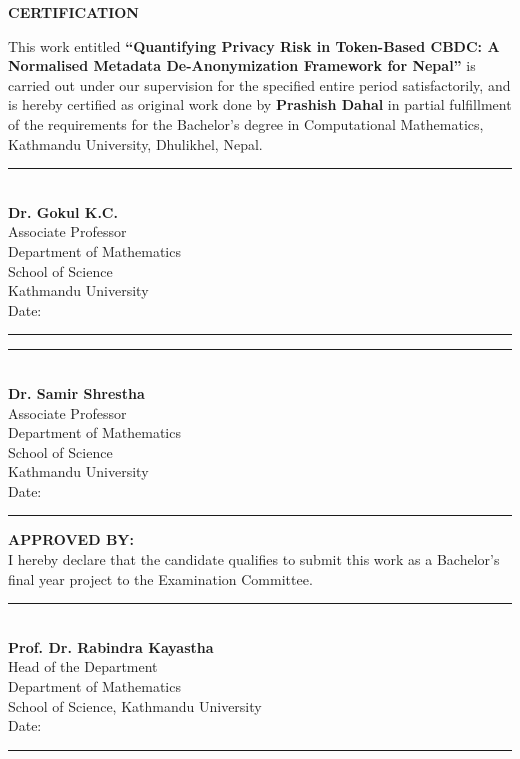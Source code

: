 \newpage
\begin{center}
{\Large \textbf{CERTIFICATION}}\\[1cm]
\end{center}

\noindent
This work entitled \textbf{``Quantifying Privacy Risk in Token-Based CBDC: A
Normalised Metadata De-Anonymization Framework for Nepal''} is carried out
under our supervision for the specified entire period satisfactorily, and is
hereby certified as original work done by \textbf{Prashish Dahal} in partial
fulfillment of the requirements for the Bachelor's degree in Computational
Mathematics, Kathmandu University, Dhulikhel, Nepal.

\vspace{1.5cm}

\noindent
\begin{minipage}[t]{0.45\textwidth}
\raggedright
\rule{5.5cm}{0.4pt}\\[0.3cm]
\textbf{Dr. Gokul K.C.}\\[0.2cm]
Associate Professor\\
Department of Mathematics\\
School of Science\\
Kathmandu University\\[0.5cm]
Date: \rule{3.5cm}{0.4pt}
\end{minipage}
\hfill
\begin{minipage}[t]{0.45\textwidth}
\raggedright
\rule{5.5cm}{0.4pt}\\[0.3cm]
\textbf{Dr. Samir Shrestha}\\[0.2cm]
Associate Professor\\
Department of Mathematics\\
School of Science\\
Kathmandu University\\[0.5cm]
Date: \rule{3.5cm}{0.4pt}
\end{minipage}

\vspace{2cm}

\noindent
\textbf{APPROVED BY:}\\

\noindent
I hereby declare that the candidate qualifies to submit this work as a Bachelor's
final year project to the Examination Committee.

\vspace{1.5cm}
\noindent
\rule{5.5cm}{0.4pt}\\[0.3cm]
\textbf{Prof. Dr. Rabindra Kayastha}\\[0.2cm]
Head of the Department\\
Department of Mathematics\\
School of Science, Kathmandu University\\[0.5cm]
Date: \rule{3.5cm}{0.4pt}
